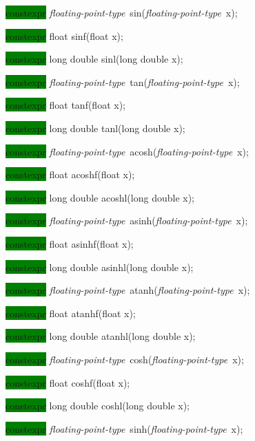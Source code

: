 \documentclass[prd,twocolumn,amsmath,amssymb,nofootinbib,eqsecnum]{revtex4-1}
\newcommand{\highlight}[1]{\colorbox{green}{\!\!\!\! #1}}
\newcommand{\fptype}{{\it floating-point-type}}
\begin{document}
{%

\highlight{constexpr} \fptype\ sin(\fptype\ x);

\highlight{constexpr} float sinf(float x);

\highlight{constexpr} long double sinl(long double x);

\vspace{2ex}


\highlight{constexpr} \fptype\ tan(\fptype\ x);

\highlight{constexpr} float tanf(float x);

\highlight{constexpr} long double tanl(long double x);

\vspace{2ex}


\highlight{constexpr} \fptype\ acosh(\fptype\ x);

\highlight{constexpr} float acoshf(float x);

\highlight{constexpr} long double acoshl(long double x);

\vspace{2ex}


\highlight{constexpr} \fptype\ asinh(\fptype\ x);

\highlight{constexpr} float asinhf(float x);

\highlight{constexpr} long double asinhl(long double x);

\vspace{2ex}


\highlight{constexpr} \fptype\ atanh(\fptype\ x);

\highlight{constexpr} float atanhf(float x);

\highlight{constexpr} long double atanhl(long double x);

\vspace{2ex}


\highlight{constexpr} \fptype\ cosh(\fptype\ x);

\highlight{constexpr} float coshf(float x);

\highlight{constexpr} long double coshl(long double x);

\vspace{2ex}


\highlight{constexpr} \fptype\ sinh(\fptype\ x);

}
\end{document}
